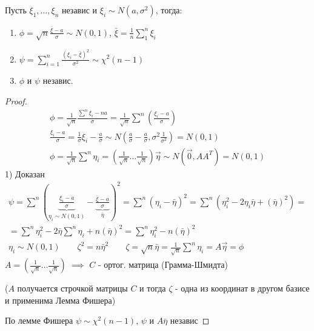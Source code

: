 \documentclass{article}
\begin{document}
\begin{theorem}[Фишера]
  Пусть $\xi_1,\dots ,\xi_n$ независ и $\xi_i\sim N(a,\sigma^{2})$, тогда:
  \begin{enumerate}
    \item $\phi=\sqrt{n}\frac{\bar{\xi}-a}{\sigma}\sim N(0,1)$,
      $\bar{\xi}=\frac{1}{n}\sum_{1}^{n}\xi_i$
    \item $\psi=\sum_{i=1}^{n}\frac{(\xi_i-\bar{\xi})^2}{\sigma^{2}}\sim \chi^{2}(n-1)$
    \item $\phi$ и $\psi$ независ.
  \end{enumerate}
\end{theorem}
\begin{proof}
  \begin{gather*}
    \phi=\frac{1}{\sqrt{n}}\frac{\sum_{}^{n}\xi_i-na}{\sigma}=\frac{1}{\sqrt{n}}\sum_{}^{n}\left(\frac{\xi_i-a}{\sigma}\right) \\ 
    \frac{\xi_i-a}{\sigma}=\frac{1}{\sigma}\xi_i-\frac{a}{\sigma} \sim N(\frac{a}{\sigma}-\frac{a}{\sigma}, \sigma^{2}\frac{1}{\sigma^{2}})=N(0,1) \\ 
  \phi = \frac{1}{\sqrt{n}}\sum_{}^{n}\eta_i=(\frac{1}{\sqrt{n}}\dots \frac{1}{\sqrt{n}})\vec{\eta}\sim N(\vec{0}, AA^{T})=N(0,1)
  \end{gather*}
  1) Доказан 
  \begin{gather*}
    \psi = \sum_{}^{n}\left(\underbrace{\frac{\xi_i-a}{\sigma}}_{\eta_i\sim N(0,1)}-\underbrace{\frac{\bar{\xi}-a}{\sigma}}_{\bar{\eta}}\right)^{2}=
    \sum_{}^{n}(\eta_i-\bar{\eta})^{2}=\sum_{}^{n}(\eta_i^2-2\eta_i \bar{\eta}+(\bar{\eta})^2)= \\
    = \sum_{}^{n}\eta_i^{2}-2\bar{\eta}\sum_{}^{n}\eta_i+n(\bar{\eta})^{2}=\sum_{}^{n}\eta_i^{2}-n(\bar{\eta})^{2} \\ 
    \eta_i\sim N(0,1) \qquad \zeta^{2}=n\bar{\eta}^{2} \qquad \zeta=\sqrt{n}\bar{\eta}=\frac{1}{\sqrt{n}}\sum_{}^{n}\eta_i=A\vec{\eta}=\phi
  \end{gather*}
  $A=\left(\frac{1}{\sqrt{n}}\dots \frac{1}{\sqrt{n}}\right)$ $\implies$ $C$ - ортог. матрица (Грамма-Шмидта)
  
  ($A$ получается строчкой матрицы $C$ и тогда $\zeta$ - одна из координат в другом базисе и применима Лемма Фишера)

  По лемме Фишера $\psi\sim \chi^{2}(n-1)$, $\psi$ и $A\bar{\eta}$ независ
\end{proof}
\end{document}
